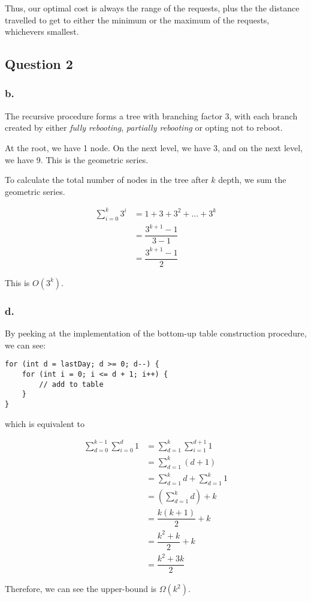 \documentclass[11pt,a4paper]{article}
\begin{document}
Thus, our optimal cost is always the range of the requests, plus the the distance travelled to get to either the minimum or the maximum of the requests, whichevers smallest.

\newpage

\subsection*{Question 2}

\subsubsection*{b.}

The recursive procedure forms a tree with branching factor 3, with each branch created by either \textit{fully rebooting}, \textit{partially rebooting} or opting not to reboot. 

At the root, we have 1 node. On the next level, we have 3, and on the next level, we have 9. This is the geometric series.

To calculate the total number of nodes in the tree after $k$ depth, we sum the geometric series.

\begin{align*}
            \sum_{i = 0}^{k} 3^i
        &= 1 + 3 + 3^2 + \ldots + 3^k\\
        & = \dfrac{3^{k + 1} - 1}{3 - 1}\\
        & = \dfrac{3^{k + 1} - 1}{2}
\end{align*}

This is $O(3^k)$.

\subsubsection*{d.}

By peeking at the implementation of the bottom-up table construction procedure, we can see:

\begin{verbatim}
for (int d = lastDay; d >= 0; d--) {
    for (int i = 0; i <= d + 1; i++) {
        // add to table
    }
}
\end{verbatim}

which is equivalent to

\begin{align*}
            \sum_{d = 0}^{k - 1} \sum_{i = 0}^{d} 1
            & = \sum_{d = 1}^{k} \sum_{i = 1}^{d + 1} 1\\
            & = \sum_{d = 1}^{k} (d + 1)\\
            & = \sum_{d = 1}^{k} d + \sum_{d = 1}^{k} 1\\
            & = (\sum_{d = 1}^{k} d) + k\\
            & = \dfrac{k(k + 1)}{2} + k\\
            & = \dfrac{k^2 + k}{2} + k\\
            & = \dfrac{k^2 + 3k}{2}
\end{align*}

Therefore, we can see the upper-bound is $\Omega(k^2)$.
\end{document}
